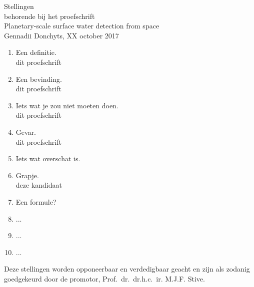 \documentclass[oneside,10pt]{article}
\begin{document}
\pagestyle{empty}
{
\centering

{\LARGE Stellingen \\}
\vspace{0.5cm}
{\large behorende bij het proefschrift \\}
\vspace{0.5cm}
{\LARGE Planetary-scale surface water detection from space \\ }
\vspace{0.5cm}
{\large Gennadii Donchyts, XX october 2017 \\}
}

\vfill


{
\large
\newcommand{\citat}[1]{\smth \hfill {\small #1}}
\newcommand{\smth}{$\left.\right.$}



\begin{enumerate}
%
\item Een definitie. \\
\citat{dit proefschrift}
%
\item Een bevinding. \\
\citat{dit proefschrift}
%
\item Iets wat je zou niet moeten doen. \\
\citat{dit proefschrift}
%
\item Gevar.  \\
\citat{dit proefschrift}
%
\item Iets wat overschat is. \\

\item Grapje. \\
\citat{deze kandidaat}

\item Een formule? \\
%

\item ... \\
%

\item ... \\

%
\item ...
%
\end{enumerate}
}


\noindent Deze stellingen worden opponeerbaar en verdedigbaar geacht en zijn als zodanig goedgekeurd door de promotor, Prof.~dr.~dr.h.c.~ir. M.J.F. Stive.
\end{document}
